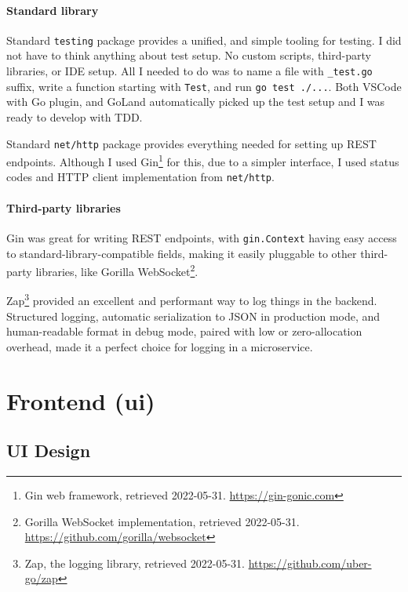 \hypertarget{standard-library}{%
\paragraph{Standard library}\label{standard-library}}

Standard \texttt{testing} package provides a unified, and simple tooling
for testing. I did not have to think anything about test setup. No
custom scripts, third-party libraries, or IDE setup. All I needed to do
was to name a file with \texttt{\_test.go} suffix, write a function
starting with \texttt{Test}, and run \texttt{go\ test\ ./...}. Both
VSCode with Go plugin, and GoLand automatically picked up the test setup
and I was ready to develop with TDD.

Standard \texttt{net/http} package provides everything needed for
setting up REST endpoints. Although I used Gin\footnote{Gin web
  framework, retrieved 2022-05-31. \url{https://gin-gonic.com}} for
this, due to a simpler interface, I used status codes and HTTP client
implementation from \texttt{net/http}.

\hypertarget{third-party-libraries}{%
\paragraph{Third-party libraries}\label{third-party-libraries}}

Gin was great for writing REST endpoints, with \texttt{gin.Context}
having easy access to standard-library-compatible fields, making it
easily pluggable to other third-party libraries, like Gorilla
WebSocket\footnote{Gorilla WebSocket implementation, retrieved
  2022-05-31. \url{https://github.com/gorilla/websocket}}.

Zap\footnote{Zap, the logging library, retrieved 2022-05-31.
  \url{https://github.com/uber-go/zap}} provided an excellent and
performant way to log things in the backend. Structured logging,
automatic serialization to JSON in production mode, and human-readable
format in debug mode, paired with low or zero-allocation overhead, made
it a perfect choice for logging in a microservice.

\hypertarget{frontend-ui}{%
\section{Frontend (ui)}\label{frontend-ui}}

\hypertarget{ui-design}{%
\subsection{UI Design}\label{ui-design}}

